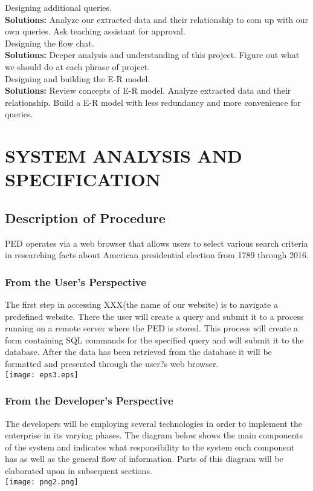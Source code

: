 \documentclass{article}
\begin{document}
 Designing additional queries.\\
{\bfseries Solutions:} Analyze our extracted data and their relationship to com up with our own queries. Ask teaching assistant for approval.\\

 Designing the flow chat.\\
{\bfseries Solutions:} Deeper analysis and understanding of this project. Figure out what we should do at each phrase of project.\\

 Designing and building the E-R model.\\
{\bfseries Solutions:} Review concepts of E-R model. Analyze extracted data and their relationship. Build a E-R model with less redundancy and more convenience for queries.\\


\section{SYSTEM ANALYSIS AND SPECIFICATION}
\subsection{Description of Procedure}
PED operates via a web browser that allows users to select various search criteria in researching facts about American presidential election from 1789 through 2016.
\subsubsection{From the User's Perspective}
The first step in accessing XXX(the name of our website) is to navigate a predefined website. There the user will create a query and submit it to a process running on a remote server where the PED is stored. This process will create a form containing SQL commands for the specified query and will submit it to the database. After the data has been retrieved from the database it will be formatted and presented through the user?s web browser.\\
\texttt{[image: eps3.eps]}
\subsubsection{From the Developer's Perspective}
The developers will be employing several technologies in order to implement the enterprise in its varying phases. The diagram below shows the main components of the system and indicates what responsibility to the system each component has as well as the general flow of information. Parts of this diagram will be elaborated upon in subsequent sections.\\
\texttt{[image: png2.png]}
\end{document}
